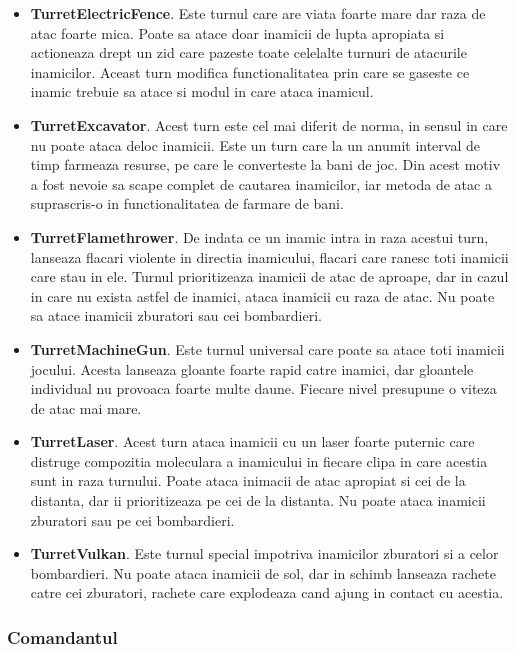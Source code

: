 \documentclass[12pt, a4paper]{article}
\begin{document}
	\begin{itemize}
		\item \textbf{TurretElectricFence}. Este turnul care are viata foarte mare dar raza de atac foarte mica. Poate sa atace doar inamicii de lupta apropiata si actioneaza drept un zid care pazeste toate celelalte turnuri de atacurile inamicilor. Aceast turn modifica functionalitatea prin care se gaseste ce inamic trebuie sa atace si modul in care ataca inamicul.
		\item \textbf{TurretExcavator}. Acest turn este cel mai diferit de norma, in sensul in care nu poate ataca deloc inamicii. Este un turn care la un anumit interval de timp farmeaza resurse, pe care le converteste la bani de joc. Din acest motiv a fost nevoie sa scape complet de cautarea inamicilor, iar metoda de atac a suprascris-o in functionalitatea de farmare de bani.
		\item \textbf{TurretFlamethrower}. De indata ce un inamic intra in raza acestui turn, lanseaza flacari violente in directia inamicului, flacari care ranesc toti inamicii care stau in ele. Turnul prioritizeaza inamicii de atac de aproape, dar in cazul in care nu exista astfel de inamici, ataca inamicii cu raza de atac. Nu poate sa atace inamicii zburatori sau cei bombardieri.
		\item \textbf{TurretMachineGun}. Este turnul universal care poate sa atace toti inamicii jocului. Acesta lanseaza gloante foarte rapid catre inamici, dar gloantele individual nu provoaca foarte multe daune. Fiecare nivel presupune o viteza de atac mai mare.
		\item \textbf{TurretLaser}. Acest turn ataca inamicii cu un laser foarte puternic care distruge compozitia moleculara a inamicului in fiecare clipa in care acestia sunt in raza turnului. Poate ataca inimacii de atac apropiat si cei de la distanta, dar ii prioritizeaza pe cei de la distanta. Nu poate ataca inamicii zburatori sau pe cei bombardieri.
		\item \textbf{TurretVulkan}. Este turnul special impotriva inamicilor zburatori si a celor bombardieri. Nu poate ataca inamicii de sol, dar in schimb lanseaza rachete catre cei zburatori, rachete care explodeaza cand ajung in contact cu acestia.
	\end{itemize}
	
	\subsubsection{Comandantul}
	\label{section: commander}
	
\end{document}
